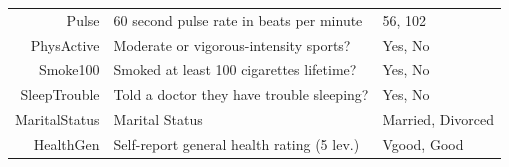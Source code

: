 \documentclass[
]{book}
\begin{document}
\begin{longtable}[]{@{}rll@{}}
\begin{minipage}[t]{0.15\columnwidth}
Pulse\strut
\end{minipage} & \begin{minipage}[t]{0.58\columnwidth}\raggedright
60 second pulse rate in beats per minute\strut
\end{minipage} & \begin{minipage}[t]{0.18\columnwidth}\raggedright
56, 102\strut
\end{minipage}\tabularnewline
\begin{minipage}[t]{0.15\columnwidth}\raggedleft
PhysActive\strut
\end{minipage} & \begin{minipage}[t]{0.58\columnwidth}\raggedright
Moderate or vigorous-intensity sports?\strut
\end{minipage} & \begin{minipage}[t]{0.18\columnwidth}\raggedright
Yes, No\strut
\end{minipage}\tabularnewline
\begin{minipage}[t]{0.15\columnwidth}\raggedleft
Smoke100\strut
\end{minipage} & \begin{minipage}[t]{0.58\columnwidth}\raggedright
Smoked at least 100 cigarettes lifetime?\strut
\end{minipage} & \begin{minipage}[t]{0.18\columnwidth}\raggedright
Yes, No\strut
\end{minipage}\tabularnewline
\begin{minipage}[t]{0.15\columnwidth}\raggedleft
SleepTrouble\strut
\end{minipage} & \begin{minipage}[t]{0.58\columnwidth}\raggedright
Told a doctor they have trouble sleeping?\strut
\end{minipage} & \begin{minipage}[t]{0.18\columnwidth}\raggedright
Yes, No\strut
\end{minipage}\tabularnewline
\begin{minipage}[t]{0.15\columnwidth}\raggedleft
MaritalStatus\strut
\end{minipage} & \begin{minipage}[t]{0.58\columnwidth}\raggedright
Marital Status\strut
\end{minipage} & \begin{minipage}[t]{0.18\columnwidth}\raggedright
Married, Divorced\strut
\end{minipage}\tabularnewline
\begin{minipage}[t]{0.15\columnwidth}\raggedleft
HealthGen\strut
\end{minipage} & \begin{minipage}[t]{0.58\columnwidth}\raggedright
Self-report general health rating (5 lev.)\strut
\end{minipage} & \begin{minipage}[t]{0.18\columnwidth}\raggedright
Vgood, Good\strut
\end{minipage}\tabularnewline
\bottomrule
\end{longtable}
\end{document}
